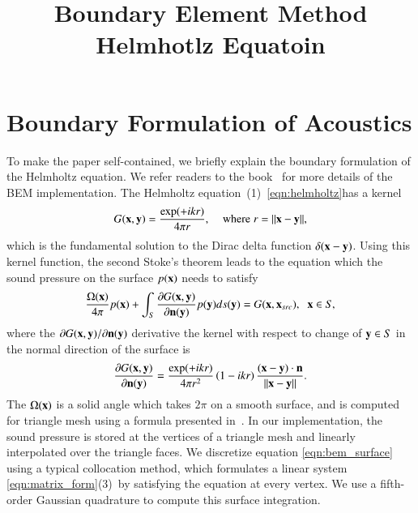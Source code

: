 




\title{Boundary Element Method\\ 
Helmhotlz Equatoin}

\maketitle


\section{Boundary Formulation of Acoustics}
\label{sec:boundary_element_forumlation}
To make the paper self-contained, we briefly explain the boundary formulation of the Helmholtz equation.
%
We refer readers to the book~\cite{Kirkup199810} for more details of the BEM implementation.
%
The Helmholtz equation~(1)~\eqref{eqn:helmholtz}\fi has a kernel
%
\begin{eqnarray}
\label{eqn:kernel}
G(\mathbf{x},\mathbf{y}) = \frac{\exp(+ikr)}{4\pi r},\;\;\;\;\mathrm{where}\;r=||\mathbf{x}-\mathbf{y}||,
\end{eqnarray}
%
which is the fundamental solution to the Dirac delta function $\delta(\mathbf{\mathbf{x}}-\mathbf{y})$.
%
Using this kernel function, the second Stoke's theorem leads to the equation which the sound pressure on the surface $p(\mathbf{x})$ needs to satisfy 
%
\begin{align}
\label{eqn:bem_surface}
\frac{\Omega(\mathbf{x})}{4\pi} p(\mathbf{x})  + \int_{S} \frac{\partial G(\mathbf{x},\mathbf{y})}{\partial \mathbf{n}(\mathbf{y})} p(\mathbf{y}) ds(\mathbf{y}) 
= G(\mathbf{x},\mathbf{x}_{src}),\;\;\mathbf{x}\in S,
\end{align}
%
where the $\partial G(\mathbf{x},\mathbf{y}) / \partial \mathbf{n}(\mathbf{y})$ derivative the kernel with respect to change of $\mathbf{y}\in S$ in the normal direction of the surface is
%
\begin{eqnarray}
\label{eqn:grad_kernel}
\frac{\partial G(\mathbf{x},\mathbf{y})}{\partial \mathbf{n}(\mathbf{y})}
=
\frac{\exp(+ikr)}{4\pi r^2}\left(1-ikr\right) \frac{(\mathbf{x}-\mathbf{y})\cdot \mathbf{n}}{||\mathbf{x}-\mathbf{y}||}.
\end{eqnarray}
%
The $\Omega(\mathbf{x})$ is a solid angle which takes $2\pi$ on a smooth surface, and is computed for triangle mesh using a formula presented in~\cite{van1983solid}.
%
In our implementation, the sound pressure is stored at the vertices of a triangle mesh and linearly interpolated over the triangle faces.
%
We discretize equation \eqref{eqn:bem_surface} using a typical collocation method, which formulates a linear system \eqref{eqn:matrix_form}\fi(3)~by satisfying the equation at every vertex. 
%
We use a fifth-order Gaussian quadrature to compute this surface integration. 



